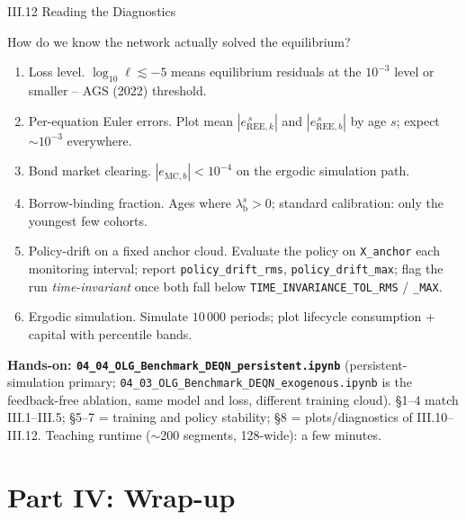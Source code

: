 \documentclass[aspectratio=169,11pt]{beamer}
\newcommand{\emphc}[1]{\textcolor{harvardcrimson}{#1}}
\newcommand{\Loss}{\ell}
\begin{document}
\begin{frame}{III.12 Reading the Diagnostics}
\footnotesize
\begin{block}{How do we know the network actually solved the equilibrium?}
\vspace{-2pt}\begin{enumerate}\itemsep1pt
    \item \emphc{Loss level.}  $\log_{10}\Loss \lesssim -5$ means equilibrium residuals at the $10^{-3}$ level or smaller -- AGS (2022) threshold.
    \item \emphc{Per-equation Euler errors.}  Plot mean $|e_{\text{REE},k}^{\,s}|$ and $|e_{\text{REE},b}^{\,s}|$ by age $s$; expect $\sim 10^{-3}$ everywhere.
    \item \emphc{Bond market clearing.}  $|e_{\text{MC},b}| < 10^{-4}$ on the ergodic simulation path.
    \item \emphc{Borrow-binding fraction.}  Ages where $\lambda_{\text{b}}^s > 0$; standard calibration: only the youngest few cohorts.
    \item \emphc{Policy-drift on a fixed anchor cloud.}  Evaluate the policy on \texttt{X\_anchor} each monitoring interval; report \texttt{policy\_drift\_rms}, \texttt{policy\_drift\_max}; flag the run \emph{time-invariant} once both fall below \texttt{TIME\_INVARIANCE\_TOL\_RMS} / \texttt{\_MAX}.
    \item \emphc{Ergodic simulation.}  Simulate $10\,000$ periods; plot lifecycle consumption + capital with percentile bands.
\end{enumerate}
\end{block}

\vspace{-2pt}
\textbf{Hands-on: \texttt{04\_04\_OLG\_Benchmark\_DEQN\_persistent.ipynb}} (persistent-simulation primary; \texttt{04\_03\_OLG\_Benchmark\_DEQN\_exogenous.ipynb} is the feedback-free ablation, same model and loss, different training cloud).  \S 1--4 match III.1--III.5; \S 5--7 = training and policy stability; \S 8 = plots/diagnostics of III.10--III.12.  Teaching runtime ($\sim$200 segments, 128-wide): a few minutes.
\end{frame}



\section{Part IV: Wrap-up}
\end{document}
